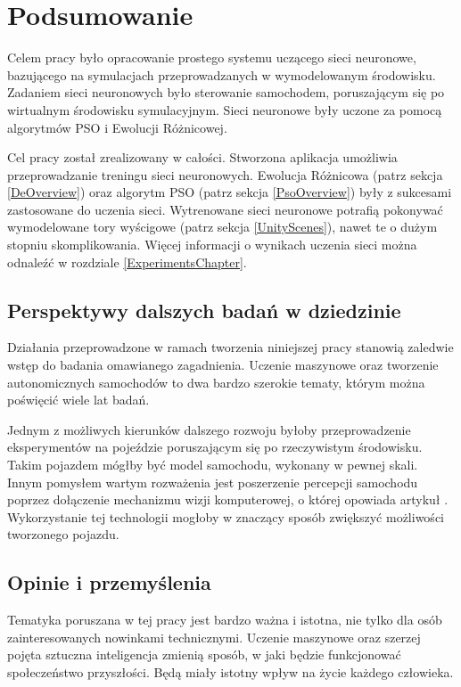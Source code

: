 \chapter*{Podsumowanie}

Celem pracy było opracowanie prostego systemu uczącego sieci neuronowe, bazującego na symulacjach przeprowadzanych w wymodelowanym środowisku. Zadaniem sieci neuronowych było sterowanie samochodem, poruszającym się po wirtualnym środowisku symulacyjnym. Sieci neuronowe były uczone za pomocą algorytmów PSO i Ewolucji Różnicowej.

Cel pracy został zrealizowany w całości. Stworzona aplikacja umożliwia przeprowadzanie treningu sieci neuronowych. Ewolucja Różnicowa (patrz sekcja \ref{DeOverview}) oraz algorytm PSO (patrz sekcja \ref{PsoOverview}) były z sukcesami zastosowane do uczenia sieci. Wytrenowane sieci neuronowe potrafią pokonywać wymodelowane tory wyścigowe (patrz sekcja \ref{UnityScenes}), nawet te o dużym stopniu skomplikowania. Więcej informacji o wynikach uczenia sieci można odnaleźć w rozdziale \ref{ExperimentsChapter}.

\vspace{2cm}
\section*{Perspektywy dalszych badań w dziedzinie}
Działania przeprowadzone w ramach tworzenia niniejszej pracy stanowią zaledwie wstęp do badania omawianego zagadnienia. Uczenie maszynowe oraz tworzenie autonomicznych samochodów to dwa bardzo szerokie tematy, którym można poświęcić wiele lat badań.

Jednym z możliwych kierunków dalszego rozwoju byłoby przeprowadzenie eksperymentów na pojeździe poruszającym się po rzeczywistym środowisku. Takim pojazdem mógłby być model samochodu, wykonany w pewnej skali. Innym pomysłem wartym rozważenia jest poszerzenie percepcji samochodu poprzez dołączenie mechanizmu wizji komputerowej, o której opowiada artykuł \cite{computerVision:overview}. Wykorzystanie tej technologii mogłoby w znaczący sposób zwiększyć możliwości tworzonego pojazdu.

\newpage
\section*{Opinie i przemyślenia}
Tematyka poruszana w tej pracy jest bardzo ważna i istotna, nie tylko dla osób zainteresowanych nowinkami technicznymi. Uczenie maszynowe oraz szerzej pojęta sztuczna inteligencja zmienią sposób, w jaki będzie funkcjonować społeczeństwo przyszłości. Będą miały istotny wpływ na życie każdego człowieka. 


